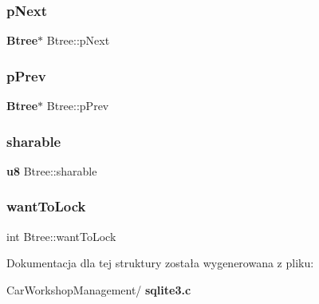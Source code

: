 \subsubsection{pNext}
{\footnotesize\ttfamily \textbf{ Btree}$\ast$ Btree\+::p\+Next}

\mbox{\label{struct_btree_a0423f1c55c1fe6812161a49bb2bf604f}} 
\subsubsection{pPrev}
{\footnotesize\ttfamily \textbf{ Btree}$\ast$ Btree\+::p\+Prev}

\mbox{\label{struct_btree_a114f157127c76a1fbad8292e4b39c4dd}} 
\subsubsection{sharable}
{\footnotesize\ttfamily \textbf{ u8} Btree\+::sharable}

\mbox{\label{struct_btree_a97368ea300f0b74b8e80ea07da0cea2a}} 
\subsubsection{wantToLock}
{\footnotesize\ttfamily int Btree\+::want\+To\+Lock}



Dokumentacja dla tej struktury została wygenerowana z pliku\+:\begin{DoxyCompactItemize}
\item 
Car\+Workshop\+Management/\textbf{ sqlite3.\+c}\end{DoxyCompactItemize}
